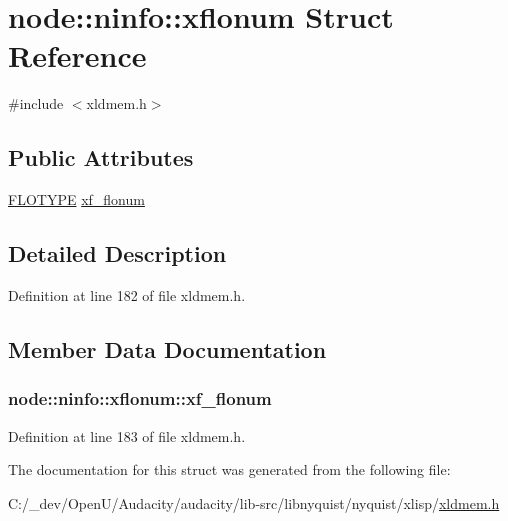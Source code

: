 \hypertarget{structnode_1_1ninfo_1_1xflonum}{}\section{node\+:\+:ninfo\+:\+:xflonum Struct Reference}
\label{structnode_1_1ninfo_1_1xflonum}


{\ttfamily \#include $<$xldmem.\+h$>$}

\subsection*{Public Attributes}
\begin{DoxyCompactItemize}
\item 
\hyperlink{xlisp_8h_ad48ad6562cfb98473274dfd4f711baed}{F\+L\+O\+T\+Y\+PE} \hyperlink{structnode_1_1ninfo_1_1xflonum_af1717eea9644f771de3935dcc810f75b}{xf\+\_\+flonum}
\end{DoxyCompactItemize}


\subsection{Detailed Description}


Definition at line 182 of file xldmem.\+h.



\subsection{Member Data Documentation}
\subsubsection[{\texorpdfstring{xf\+\_\+flonum}{xf_flonum}}]{ node\+::ninfo\+::xflonum\+::xf\+\_\+flonum}\hypertarget{structnode_1_1ninfo_1_1xflonum_af1717eea9644f771de3935dcc810f75b}{}\label{structnode_1_1ninfo_1_1xflonum_af1717eea9644f771de3935dcc810f75b}


Definition at line 183 of file xldmem.\+h.



The documentation for this struct was generated from the following file\+:\begin{DoxyCompactItemize}
\item 
C\+:/\+\_\+dev/\+Open\+U/\+Audacity/audacity/lib-\/src/libnyquist/nyquist/xlisp/\hyperlink{xldmem_8h}{xldmem.\+h}\end{DoxyCompactItemize}
